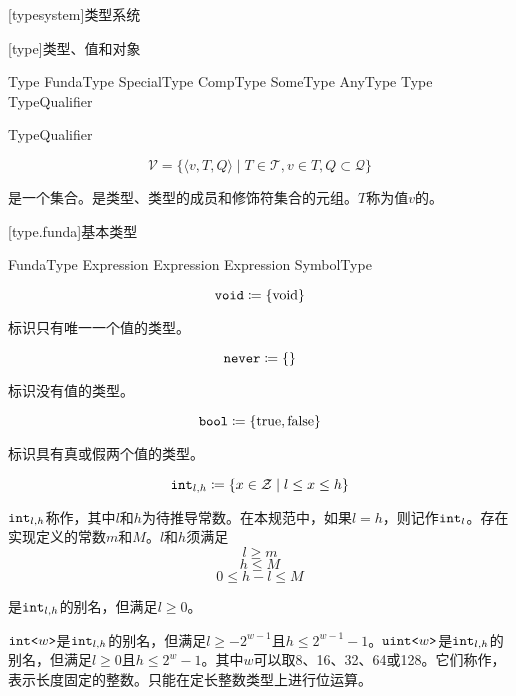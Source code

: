 
[typesystem]{类型系统}

[type]{类型、值和对象}

\begin{bnf}{Type}
    FundaType \br
    SpecialType \br
    CompType \br
    SomeType \br
    AnyType \br
    Type TypeQualifier
\end{bnf}

\begin{bnf}{TypeQualifier}
     \br
\end{bnf}

$$ \mathcal{V} = \{ \langle v, T, Q \rangle \mid T \in \mathcal{T}, v \in T, Q \subset \mathcal{Q} \} $$

\pnum
{}是一个集合。是类型、类型的成员和修饰符集合的元组。$T$称为值$v$的。

[type.funda]{基本类型}

\begin{bnf}{FundaType}
     \br
     \br
     \br
     \br
     \br
     \terminal{<} Expression \terminal{>} \br
     \terminal{<} Expression \terminal{>} \br
     \br
     \terminal{<} Expression \terminal{>} \br
    SymbolType
\end{bnf}

$$\texttt{void} \coloneqq \{ \mathrm{void} \}$$

\pnum
{}标识只有唯一一个值的类型。

$$\texttt{never} \coloneqq \{ \}$$

\pnum
{}标识没有值的类型。

$$\texttt{bool} \coloneqq \{ \mathrm{true}, \mathrm{false} \}$$

\pnum
{}标识具有真或假两个值的类型。

$$\texttt{int}_{l,h} \coloneqq \{ x \in \mathcal{Z} \mid l \le x \le h \} $$

\pnum
$\texttt{int}_{l,h}$称作，其中$l$和$h$为待推导常数。在本规范中，如果$l = h$，则记作$\texttt{int}_l$。存在实现定义的常数$m$和$M$。$l$和$h$须满足
$$ l \ge m $$
$$ h \le M $$
$$ 0 \le h - l \le M $$

是$\texttt{int}_{l,h}$的别名，但满足$l\ge0$。

\pnum
$\texttt{int<}w\texttt{>}$是$\texttt{int}_{l,h}$的别名，但满足$l\ge-2^{w-1}$且$h\le2^{w-1}-1$。$\texttt{uint<}w\texttt{>}$是$\texttt{int}_{l,h}$的别名，但满足$l\ge0$且$h\le2^w-1$。其中$w$可以取8、16、32、64或128。它们称作，表示长度固定的整数。只能在定长整数类型上进行位运算。

